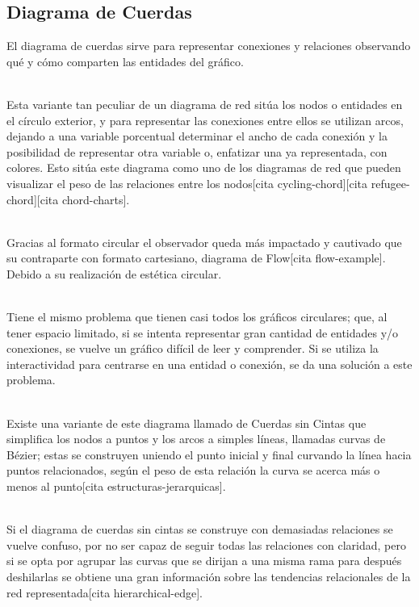 \documentclass{article}\usepackage[]{graphicx}\usepackage[]{color}
\begin{document}
\subsection{Diagrama de Cuerdas}
El diagrama de cuerdas sirve para representar conexiones y relaciones observando qu\'e y c\'omo comparten las entidades del gr\'afico.~\\~\par
Esta variante tan peculiar de un diagrama de red sit\'ua los nodos o entidades en el c\'irculo exterior, y para representar las conexiones entre ellos se utilizan arcos, dejando a una variable porcentual determinar el ancho de cada conexi\'on y la posibilidad de representar otra variable o, enfatizar una ya representada, con colores. Esto sit\'ua este diagrama como uno de los diagramas de red que pueden visualizar el peso de las relaciones entre los nodos[cita cycling-chord][cita refugee-chord][cita chord-charts].~\\~\par
Gracias al formato circular el observador queda m\'as impactado y cautivado que su contraparte con formato cartesiano, diagrama de Flow[cita flow-example]. Debido a su realizaci\'on de est\'etica circular.~\\~\par
Tiene el mismo problema que tienen casi todos los gr\'aficos circulares; que, al tener espacio limitado, si se intenta representar gran cantidad de entidades y/o conexiones, se vuelve un gr\'afico dif\'icil de leer y comprender. Si se utiliza la interactividad para centrarse en una entidad o conexi\'on, se da una soluci\'on a este problema.~\\~\par
Existe una variante de este diagrama llamado de Cuerdas sin Cintas que simplifica los nodos a puntos y los arcos a simples l\'ineas, llamadas curvas de B\'ezier; estas se construyen uniendo el punto inicial y final curvando la l\'inea hacia puntos relacionados,  seg\'un el peso de esta relaci\'on la curva se acerca m\'as o menos al punto[cita estructuras-jerarquicas].~\\~\par
\clearpage
Si el diagrama de cuerdas sin cintas se construye con demasiadas relaciones se vuelve confuso, por no ser capaz de seguir todas las relaciones con claridad, pero si se opta por agrupar las curvas que se dirijan a una misma rama para despu\'es deshilarlas se obtiene una gran informaci\'on sobre las tendencias relacionales de la red representada[cita hierarchical-edge].~\\~\par
\end{document}
